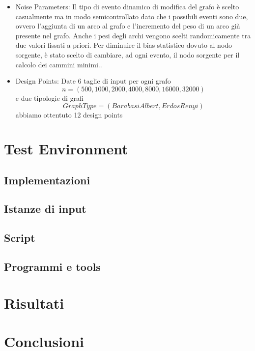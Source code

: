 \documentclass[a4paper]{article}
\begin{document}
\begin{itemize}
\item Noise Parameters: Il tipo di evento dinamico di modifica del grafo è scelto casualmente ma in modo semicontrollato dato che i possibili eventi sono due, ovvero l'aggiunta di un arco al grafo e l'incremento del peso di un arco già presente nel grafo. Anche i pesi degli archi vengono scelti randomicamente tra due valori fissati a priori. Per diminuire il bias statistico dovuto al nodo sorgente, è stato scelto di cambiare, ad ogni evento, il nodo sorgente per il calcolo dei cammini minimi..
\item Design Points: Date 6 taglie di input per ogni grafo
\[n = (500,1000,2000,4000,8000,16000,32000)\]
e due tipologie di grafi \[GraphType = (BarabasiAlbert, ErdosRenyi)\] abbiamo ottentuto 12 design points
\end{itemize}

\section{Test Environment}
\subsection{Implementazioni}
\subsection{Istanze di input}
\subsection{Script}
\subsection{Programmi e tools}

\section{Risultati}

\section{Conclusioni}
\end{document}
